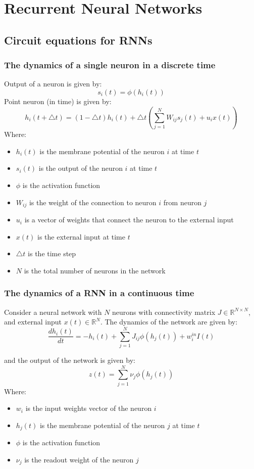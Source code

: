 \documentclass[11pt]{book} %
\begin{document}
%
%
%
%
%
%
%
%
%
%
%
%
%
%
%
%


\chapter{Recurrent Neural Networks}

\section{Circuit equations for RNNs}


\subsection{The dynamics of a single neuron in a discrete time}
Output of a neuron is given by:
\[
    s_i(t) = \phi(h_i(t))
\]
Point neuron (in time) is given by:
\[
    h_i(t + \bigtriangleup  t) = (1 - \bigtriangleup t) h_i(t) + \bigtriangleup t (\sum_{j=1}^N W_{ij} s_j(t) + u_ix(t))
\]
Where:
\begin{itemize}
    \item $h_i(t)$ is the membrane potential of the neuron $i$ at time $t$
    \item $s_i(t)$ is the output of the neuron $i$ at time $t$
    \item $\phi$ is the activation function
    \item $W_{ij}$ is the weight of the connection to neuron $i$ from neuron $j$
    \item $u_i$ is a vector of weights that connect the neuron to the external input
    \item $x(t)$ is the external input at time $t$
    \item $\bigtriangleup t$ is the time step
    \item $N$ is the total number of neurons in the network
\end{itemize}

\subsection{The dynamics of a RNN in a continuous time}
Consider a neural network with $N$ neurons with connectivity matrix $J \in \mathbb{R}^{N \times N}$, and external input $x(t) \in \mathbb{R}^N$.
The dynamics of the network are given by:
\[
    \frac{dh_i(t)}{dt} = -h_i(t) + \sum_{j=1}^N J_{ij} \phi(h_j(t)) + w_i^{in} I(t)
\]

and the output of the network is given by:
\[
    z(t) = \sum_{j=1}^N \nu_j \phi(h_j(t))
\]
Where:
\begin{itemize}
    \item $w_i$ is the input weights vector of the neuron $i$
    \item $h_j(t)$ is the membrane potential of the neuron $j$ at time $t$
    \item $\phi$ is the activation function
    \item $\nu_j$ is the readout weight of the neuron $j$
\end{itemize}
\end{document}
